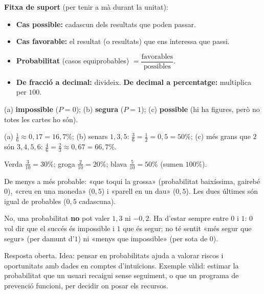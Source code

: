 \begin{idea}
\textbf{Fitxa de suport} (per tenir a mà durant la unitat):
\begin{itemize}[leftmargin=1.4em, itemsep=1pt]
  \item \textbf{Cas possible:} cadascun dels resultats que poden passar.
  \item \textbf{Cas favorable:} el resultat (o resultats) que ens interessa que passi.
  \item \textbf{Probabilitat} (casos equiprobables) $=\dfrac{\text{favorables}}{\text{possibles}}$.
  \item \textbf{De fracció a decimal:} divideix. \quad \textbf{De decimal a percentatge:}
        multiplica per $100$.
\end{itemize}
\end{idea}

\begin{solucions}
\begin{sollist}
  \item (a) \textbf{impossible} ($P=0$); (b) \textbf{segura} ($P=1$); (c)
        \textbf{possible} (hi ha figures, però no totes les cartes ho són).
  \item (a) $\frac{1}{6}\approx 0,17=16,7\%$; (b) senars $1,3,5$: $\frac{3}{6}=\frac{1}{2}=0,5=50\%$;
        (c) més grans que $2$ són $3,4,5,6$: $\frac{4}{6}=\frac{2}{3}\approx 0,67=66,7\%$.
  \item Verda $\frac{3}{10}=30\%$; groga $\frac{2}{10}=20\%$; blava $\frac{5}{10}=50\%$
        (sumen $100\%$).
  \item De menys a més probable: «que toqui la grossa» (probabilitat baixíssima,
        gairebé $0$), «creu en una moneda» ($0,5$) i «parell en un dau» ($0,5$). Les
        dues últimes són igual de probables ($0,5$ cadascuna).
  \item No, una probabilitat \textbf{no} pot valer $1,3$ ni $-0,2$. Ha d'estar sempre
        entre $0$ i $1$: $0$ vol dir que el succés és impossible i $1$ que és segur; no
        té sentit «més segur que segur» (per damunt d'$1$) ni «menys que impossible»
        (per sota de $0$).
  \item Resposta oberta. Idea: pensar en probabilitats ajuda a valorar riscos i
        oportunitats amb dades en comptes d'intuïcions. Exemple vàlid: estimar la
        probabilitat que un usuari recaigui sense seguiment, o que un programa de
        prevenció funcioni, per decidir on posar els recursos.
\end{sollist}
\end{solucions}

